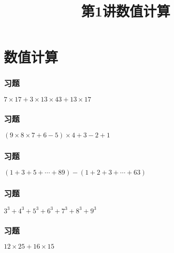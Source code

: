 \section{数值计算}

\title[第1讲\quad 数值计算]{第1讲\quad 数值计算} 
\author{}
\date{}
\begin{frame}
    \titlepage
\end{frame}


\begin{frame}
    \frametitle{习题\theframecounter}
    \vspace*{-3cm}
    \centering\textit{\Large $7\times 17 + 3\times 13\times 43 + 13\times 17$}
\end{frame}

\begin{frame}
    \frametitle{习题\theframecounter}
    \vspace*{-3cm}
    \centering\textit{\Large $(9\times 8\times 7 + 6 - 5)\times 4 + 3 -2 +1$ }
\end{frame}




\begin{frame}
    \frametitle{习题\theframecounter} 
    \vspace*{-3cm}   
    \centering\textit{\Large $(1+3+5+\cdots + 89) - (1+2+3+\cdots + 63)$}
\end{frame}



\begin{frame}
    \frametitle{习题\theframecounter}  
    \vspace*{-3cm}  
    \centering\textit{\Large $3^3 + 4^3 + 5^3 + 6^3 + 7^3 + 8^3 + 9^3$}
\end{frame}


\begin{frame}
    \frametitle{习题\theframecounter} 
    \vspace*{-3cm}   
    \centering\textit{\Large $12\times 25 + 16\times 15$}
\end{frame}



